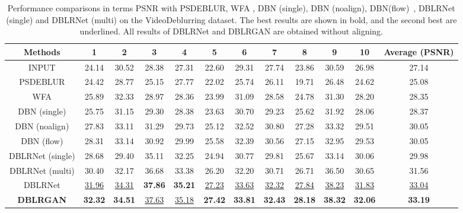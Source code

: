 \documentclass[journal]{IEEEtran}
\begin{document}
\begin{table*}[htb]
  \centering
  \caption{Performance comparisons in terms PSNR with PSDEBLUR, WFA \cite{delbracio2015burst}, DBN (single), DBN (noalign), DBN(flow)~\cite{su2016deep}, DBLRNet (single) and DBLRNet (multi) on the VideoDeblurring dataset. The best results are shown in bold, and the second best are underlined. All results of DBLRNet and DBLRGAN are obtained without aligning.}
    \begin{tabular}{c|cccccccccc|c}
    \toprule
  Methods   & 1 & 2 & 3 & 4 & 5 & 6 & 7 & 8 & 9 & 10 & Average (PSNR) \\
    \midrule
    INPUT   & 24.14 & 30.52  & 28.38  & 27.31  & 22.60  & 29.31  & 27.74  & 23.86 & 30.59 & 26.98 & 27.14 \\
    PSDEBLUR   & 24.42  & 28.77  & 25.15  & 27.77  & 22.02  & 25.74  & 26.11  & 19.71 & 26.48 & 24.62 & 25.08  \\
    WFA  & 25.89  & 32.33  & 28.97  & 28.36  & 23.99  & 31.09  & 28.58  & 24.78 & 31.30 & 28.20 & 28.35 \\
    DBN (single)   & 25.75  & 31.15  & 29.30  & 28.38  & 23.63  & 30.70  & 29.23  & 25.62 & 31.92 & 28.06 & 28.37 \\
    DBN (noalign)  & 27.83  & 33.11  & 31.29  & 29.73  & 25.12  & 32.52  & 30.80  & 27.28 & 33.32 & 29.51 & 30.05 \\
    DBN (flow)  & 28.31  & 33.14  & 30.92  & 29.99  & 25.58  & 32.39  & 30.56  & 27.15 & 32.95 & 29.53 & 30.05 \\
  \hline
    DBLRNet (single)  & 28.68  & 29.40  & 35.11  & 32.25  & 24.94  & 30.77  &  29.81 & 25.67 & 33.14 & 30.06 & 29.98  \\
    DBLRNet (multi)  & 30.40  & 32.17  & 36.68  & 33.38  & 26.20  &  32.20 & 30.71  & 26.71 & 36.50 & 30.65 & 31.56 \\
    DBLRNet   & \underline{31.96}  & \underline{34.31}  & \textbf{37.86}  & \textbf{35.21}  & \underline{27.23}  & \underline{33.63}  & \underline{32.32}  & \underline{27.84} & \underline{38.23} & \underline{31.83} & \underline{33.04} \\
   \hline
    \textbf{DBLRGAN} & \textbf{32.32}  &\textbf{34.51}  & \underline{37.63}  & \underline{35.18}  & \textbf{27.42}  & \textbf{33.81}  & \textbf{32.43}  & \textbf{28.18} & \textbf{38.32} & \textbf{32.06} & \textbf{33.19} \\
    \bottomrule
    \end{tabular}
  \label{table3}
\end{table*}
\end{document}
